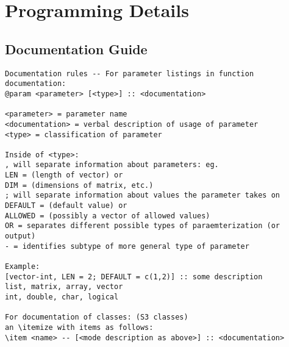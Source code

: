 \documentclass[11pt]{article}
\begin{document}
\pagebreak
\section{Programming Details}
\subsection{Documentation Guide}
\begin{verbatim}
Documentation rules -- For parameter listings in function documentation: 
@param <parameter> [<type>] :: <documentation>

<parameter> = parameter name
<documentation> = verbal description of usage of parameter
<type> = classification of parameter

Inside of <type>: 
, will separate information about parameters: eg. 
LEN = (length of vector) or 
DIM = (dimensions of matrix, etc.)
; will separate information about values the parameter takes on
DEFAULT = (default value) or
ALLOWED = (possibly a vector of allowed values)
OR = separates different possible types of paraemterization (or output)
- = identifies subtype of more general type of parameter

Example: 
[vector-int, LEN = 2; DEFAULT = c(1,2)] :: some description
list, matrix, array, vector
int, double, char, logical

For documentation of classes: (S3 classes)
an \itemize with items as follows: 
\item <name> -- [<mode description as above>] :: <documentation>

\end{verbatim}
\end{document}

